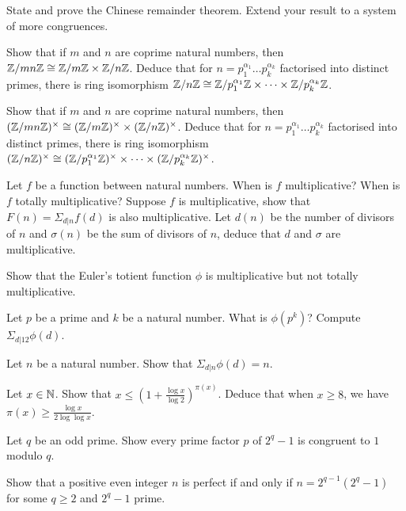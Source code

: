 \begin{question}{3}
    State and prove the Chinese remainder theorem. Extend your result to a system of more congruences. 
    
    Show that if $m$ and $n$ are coprime natural numbers, then $\mathbb{Z}/mn\mathbb{Z} \cong \mathbb{Z}/m\mathbb{Z} \times \mathbb{Z}/n\mathbb{Z}$. Deduce that for $n = p_1^{\alpha_1}\dots p_k^{\alpha_k}$ factorised into distinct primes, there is ring isomorphism $\mathbb{Z} / n\mathbb{Z} \cong \mathbb{Z}/p_1^{\alpha_1}\mathbb{Z} \times \dots \times \mathbb{Z} / p_k^{\alpha_k} \mathbb{Z}$.

    Show that if $m$ and $n$ are coprime natural numbers, then $(\mathbb{Z}/mn\mathbb{Z})^\times \cong (\mathbb{Z}/m\mathbb{Z})^\times \times (\mathbb{Z}/n\mathbb{Z})^\times$. Deduce that for $n = p_1^{\alpha_1}\dots p_k^{\alpha_k}$ factorised into distinct primes, there is ring isomorphism $(\mathbb{Z} / n\mathbb{Z})^\times \cong (\mathbb{Z}/p_1^{\alpha_1}\mathbb{Z})^\times \times \dots \times (\mathbb{Z} / p_k^{\alpha_k} \mathbb{Z})^\times$.
\end{question}

\begin{question}{4}
    Let $f$ be a function between natural numbers. When is $f$ multiplicative? When is $f$ totally multiplicative? Suppose $f$ is multiplicative, show that $F(n) = \Sigma_{d|n} f(d)$ is also multiplicative. Let $d(n)$ be the number of divisors of $n$ and $\sigma(n)$ be the sum of divisors of $n$, deduce that $d$ and $\sigma$ are multiplicative.

    Show that the Euler's totient function $\phi$ is multiplicative but not totally multiplicative.

    Let $p$ be a prime and $k$ be a natural number. What is $\phi(p^k)$? Compute $\Sigma_{d|12} \phi(d)$.

    Let $n$ be a natural number. Show that $\Sigma_{d|n} \phi(d) = n$.
\end{question}

\begin{question}{1.1}
	Let $x \in \mathbb{N}$. Show that $x \leq (1 + \frac{\log x}{\log 2})^{\pi(x)}$. Deduce that when $x \geq 8$, we have $\pi(x) \geq \frac{\log x}{2 \log \log x}$.
\end{question}

\begin{question}{1.2}
	Let $q$ be an odd prime. Show every prime factor $p$ of $2^q -1$ is congruent to $1$ modulo $q$.
\end{question}

\begin{question}{1.3}
	Show that a positive even integer $n$ is perfect if and only if $n = 2^{q-1}(2^q-1)$ for some $q \geq 2$ and $2^q-1$ prime.
\end{question}

